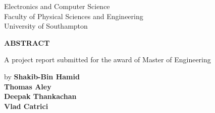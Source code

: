 \thispagestyle{plain}
\begin{center}
    \large
    Electronics and Computer Science\\
    Faculty of Physical Sciences and Engineering\\
    University of Southampton\\
        
    \vspace{1.5cm}
    
    \textbf{ABSTRACT}
    
    \vspace{1.5cm}
    
    A project report submitted for the award of Master of Engineering
    
    \large
    by \textbf{Shakib-Bin Hamid} \\ \textbf{Thomas Aley} \\ \textbf{Deepak Thankachan} \\ \textbf{Vlad Catrici}
\end{center}

\vspace{1.5cm}
    
\large
